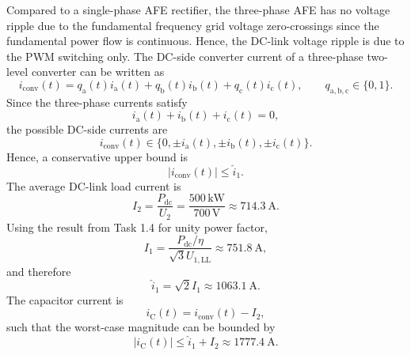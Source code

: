 \begin{solutionblock}
	Compared to a single-phase AFE rectifier, the three-phase AFE has no voltage ripple due to the fundamental frequency grid voltage zero-crossings since the fundamental power flow is continuous. Hence, the DC-link voltage ripple is due to the PWM switching only. The DC-side converter current of a three-phase two-level converter can be written as
	\begin{equation*}
		i_{\mathrm{conv}}(t)
		=
		q_\mathrm{a}(t)i_\mathrm{a}(t)+q_\mathrm{b}(t)i_\mathrm{b}(t)+q_\mathrm{c}(t)i_\mathrm{c}(t),
		\qquad q_{\mathrm{a},\mathrm{b},\mathrm{c}}\in\{0,1\}.
	\end{equation*}
	Since the three-phase currents satisfy
	\begin{equation*}
		i_\mathrm{a}(t)+i_\mathrm{b}(t)+i_\mathrm{c}(t)=0,
	\end{equation*}
	the possible DC-side currents are
	\begin{equation*}
		i_{\mathrm{conv}}(t)
		\in
		\{0,\pm i_\mathrm{a}(t),\pm i_\mathrm{b}(t),\pm i_\mathrm{c}(t)\}.
	\end{equation*}
	Hence, a conservative upper bound is
	\begin{equation*}
		\left|i_{\mathrm{conv}}(t)\right|
		\leq \hat i_{\mathrm{1}}.
	\end{equation*}
	The average DC-link load current is
	\begin{equation*}
		I_{\mathrm{2}}
		=
		\frac{P_{\mathrm{dc}}}{U_{\mathrm{2}}}
		=
		\frac{500\,\mathrm{kW}}{700\,\mathrm{V}}
		\approx \SI{714.3}{\ampere}.
	\end{equation*}
	Using the result from Task 1.4 for unity power factor,
	\begin{equation*}
		I_{\mathrm{1}}
		=
		\frac{P_{\mathrm{dc}}/\eta}
		{\sqrt{3}U_{\mathrm{1,LL}}}
		\approx \SI{751.8}{\ampere},
	\end{equation*}
	and therefore
	\begin{equation*}
		\hat i_{\mathrm{1}}
		=
		\sqrt{2}I_{\mathrm{1}}
		\approx \SI{1063.1}{\ampere}.
	\end{equation*}
	The capacitor current is
	\begin{equation*}
		i_\mathrm{C}(t)=i_{\mathrm{conv}}(t)-I_{\mathrm{2}},
	\end{equation*}
	such that the worst-case magnitude can be bounded by
	\begin{equation*}
		|i_\mathrm{C}(t)|
		\leq
		\hat i_{\mathrm{1}}+I_{\mathrm{2}}
		\approx \SI{1777.4}{\ampere}.
	\end{equation*}

\end{solutionblock}
